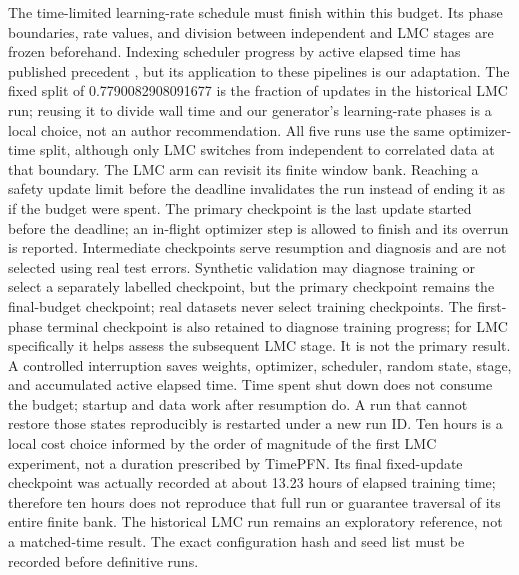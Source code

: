 The time-limited learning-rate schedule must finish within this budget.
Its phase boundaries, rate values, and division between independent and
LMC stages are frozen beforehand. Indexing scheduler progress by active
elapsed time has published precedent \citep{kaddour2023notrainnogain}, but
its application to these pipelines is our adaptation. The fixed split
of 0.7790082908091677 is the fraction of updates in the historical
LMC run; reusing it to divide wall time and our generator's learning-rate
phases is a local choice, not an author recommendation. All five runs use the
same optimizer-time split, although only LMC switches from independent to
correlated data at that boundary. The LMC arm can revisit its
finite window bank. Reaching a safety update limit before the deadline
invalidates the run instead of ending it as if the budget were spent.
The primary checkpoint is the last update started before the deadline;
an in-flight optimizer step is allowed to finish and its overrun is reported.
Intermediate checkpoints
serve resumption and diagnosis and are not selected using real test errors.
Synthetic validation may diagnose training or select a separately labelled
checkpoint, but the primary checkpoint remains the final-budget checkpoint;
real datasets never select training checkpoints.
The first-phase terminal checkpoint is also retained to diagnose training
progress; for LMC specifically it helps assess the subsequent LMC stage. It
is not the primary result. A
controlled interruption saves weights, optimizer, scheduler, random state,
stage, and accumulated active elapsed time. Time spent shut down does not
consume the budget; startup and data work after resumption do. A run that
cannot restore those states reproducibly is restarted under a new run ID.
Ten hours is a local cost choice informed by the order of magnitude of the
first LMC experiment, not a duration prescribed by TimePFN. Its final
fixed-update checkpoint was actually recorded at about 13.23 hours of
elapsed training time; therefore ten hours does not reproduce that full run
or guarantee traversal of its entire finite bank. The historical LMC run
remains an exploratory reference, not a matched-time result. The exact
configuration hash and seed list must be recorded before definitive runs.

